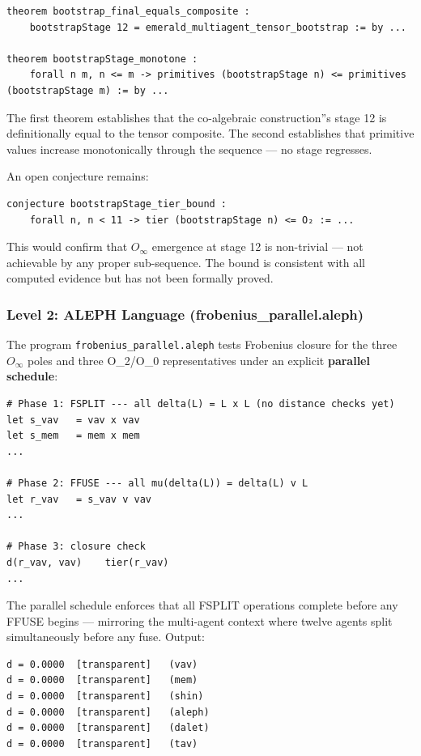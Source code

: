 \documentclass[12pt,a4paper]{article}
\begin{document}
\begin{lstlisting}[language=lean]
theorem bootstrap_final_equals_composite :
    bootstrapStage 12 = emerald_multiagent_tensor_bootstrap := by ...

theorem bootstrapStage_monotone :
    forall n m, n <= m -> primitives (bootstrapStage n) <= primitives (bootstrapStage m) := by ...
\end{lstlisting}

The first theorem establishes that the co-algebraic construction''s stage 12 is definitionally equal to the tensor composite. The second establishes that primitive values increase monotonically through the sequence --- no stage regresses.

An open conjecture remains:

\begin{lstlisting}[language=lean]
conjecture bootstrapStage_tier_bound :
    forall n, n < 11 -> tier (bootstrapStage n) <= O₂ := ...
\end{lstlisting}

This would confirm that $O_{\infty}$ emergence at stage 12 is non-trivial --- not achievable by any proper sub-sequence. The bound is consistent with all computed evidence but has not been formally proved.

\subsubsection{Level 2: ALEPH Language (frobenius\_parallel.aleph)}

The program \texttt{frobenius\_parallel.aleph} tests Frobenius closure for the three $O_{\infty}$ poles and three O\_2/O\_0 representatives under an explicit \textbf{parallel schedule}:

\begin{lstlisting}
# Phase 1: FSPLIT --- all delta(L) = L x L (no distance checks yet)
let s_vav   = vav x vav
let s_mem   = mem x mem
...

# Phase 2: FFUSE --- all mu(delta(L)) = delta(L) v L
let r_vav   = s_vav v vav
...

# Phase 3: closure check
d(r_vav, vav)    tier(r_vav)
...
\end{lstlisting}

The parallel schedule enforces that all FSPLIT operations complete before any FFUSE begins --- mirroring the multi-agent context where twelve agents split simultaneously before any fuse. Output:

\begin{lstlisting}
d = 0.0000  [transparent]   (vav)
d = 0.0000  [transparent]   (mem)
d = 0.0000  [transparent]   (shin)
d = 0.0000  [transparent]   (aleph)
d = 0.0000  [transparent]   (dalet)
d = 0.0000  [transparent]   (tav)
\end{lstlisting}
\end{document}
